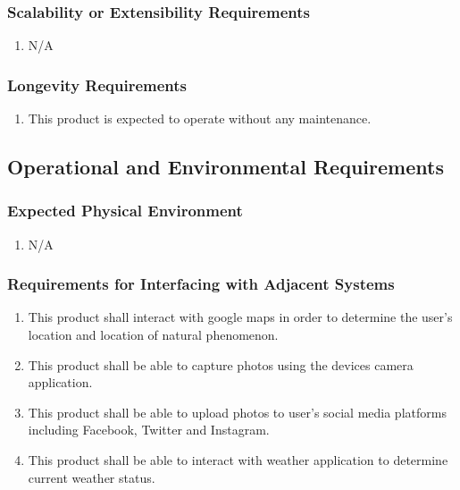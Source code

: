 \documentclass[]{article}
\begin{document}
\subsubsection{Scalability or Extensibility Requirements}
\label{ssub:scalability_or_extensibility_requirements}
\begin{enumerate}[{PR}1. ]
	\item N/A
\end{enumerate}

\subsubsection{Longevity Requirements}
\label{ssub:longevity_requirements}
\begin{enumerate}[{PR}1. ]
	\item This product is expected to operate without any maintenance.
\end{enumerate}


\subsection{Operational and Environmental Requirements}
\label{sub:operational_and_environmental_requirements}

\subsubsection{Expected Physical Environment}
\label{ssub:expected_physical_environment}
\begin{enumerate}[{OE}1. ]
	\item N/A
\end{enumerate}

\subsubsection{Requirements for Interfacing with Adjacent Systems}
\label{ssub:requirements_for_interfacing_with_adjacent_systems}
\begin{enumerate}[{OE}1. ]
	\item This product shall interact with google maps in order to determine the user's location and location of natural phenomenon.
	\item This product shall be able to capture photos using the devices camera application.
	\item This product shall be able to upload photos to user's social media platforms including Facebook, Twitter and Instagram.
	\item This product shall be able to interact with weather application to determine current weather status.
\end{enumerate}
\end{document}
